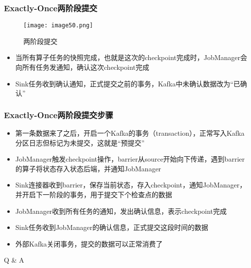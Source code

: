 \documentclass{beamer}
\begin{document}
  \begin{frame}
      \frametitle{Exactly-Once两阶段提交}
      
      \begin{figure}
      	\centering
      	\texttt{[image: image50.png]}
      	\caption{两阶段提交}
      \end{figure}
  
      \begin{itemize}
          \item 当所有算子任务的快照完成，也就是这次的checkpoint完成时，JobManager会向所有任务发通知，确认这次checkpoint完成
          \item Sink任务收到确认通知，正式提交之前的事务，Kafka中未确认数据改为“已确认”
      \end{itemize}
  
  \end{frame}

  \begin{frame}
      \frametitle{Exactly-Once两阶段提交步骤}
  
      \begin{itemize}
          \item 第一条数据来了之后，开启一个Kafka的事务（transaction），正常写入Kafka分区日志但标记为未提交，这就是“预提交”
          \item JobManager触发checkpoint操作，barrier从source开始向下传递，遇到barrier的算子将状态存入状态后端，并通知JobManager
          \item Sink连接器收到barrier，保存当前状态，存入checkpoint，通知JobManager，并开启下一阶段的事务，用于提交下个检查点的数据
          \item JobManager收到所有任务的通知，发出确认信息，表示checkpoint完成
          \item Sink任务收到JobManager的确认信息，正式提交这段时间的数据
          \item 外部Kafka关闭事务，提交的数据可以正常消费了
      \end{itemize}
  
  \end{frame}

  \begin{frame}[plain,c]
    
    \begin{center}
    \Huge Q \& A
    \end{center}
    
  \end{frame}
\end{document}
